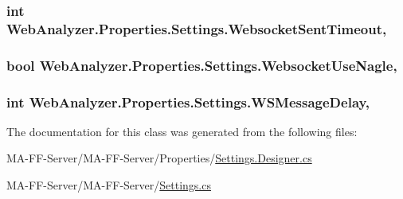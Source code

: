 \subsubsection[{Websocket\+Sent\+Timeout}]{\setlength{\rightskip}{0pt plus 5cm}int Web\+Analyzer.\+Properties.\+Settings.\+Websocket\+Sent\+Timeout\hspace{0.3cm}{\ttfamily [get]}, {\ttfamily [set]}}\label{class_web_analyzer_1_1_properties_1_1_settings_ae53e9129c252eb6a1d2d1c475e6cd8b7}
\hypertarget{class_web_analyzer_1_1_properties_1_1_settings_afabd82687970641a0e6ac78e36cf83d6}{}
\subsubsection[{Websocket\+Use\+Nagle}]{\setlength{\rightskip}{0pt plus 5cm}bool Web\+Analyzer.\+Properties.\+Settings.\+Websocket\+Use\+Nagle\hspace{0.3cm}{\ttfamily [get]}, {\ttfamily [set]}}\label{class_web_analyzer_1_1_properties_1_1_settings_afabd82687970641a0e6ac78e36cf83d6}
\hypertarget{class_web_analyzer_1_1_properties_1_1_settings_a62b7526a2c670219322da46a41f2ed4b}{}
\subsubsection[{W\+S\+Message\+Delay}]{\setlength{\rightskip}{0pt plus 5cm}int Web\+Analyzer.\+Properties.\+Settings.\+W\+S\+Message\+Delay\hspace{0.3cm}{\ttfamily [get]}, {\ttfamily [set]}}\label{class_web_analyzer_1_1_properties_1_1_settings_a62b7526a2c670219322da46a41f2ed4b}


The documentation for this class was generated from the following files\+:\begin{DoxyCompactItemize}
\item 
M\+A-\/\+F\+F-\/\+Server/\+M\+A-\/\+F\+F-\/\+Server/\+Properties/\hyperlink{_settings_8_designer_8cs}{Settings.\+Designer.\+cs}\item 
M\+A-\/\+F\+F-\/\+Server/\+M\+A-\/\+F\+F-\/\+Server/\hyperlink{_settings_8cs}{Settings.\+cs}\end{DoxyCompactItemize}
